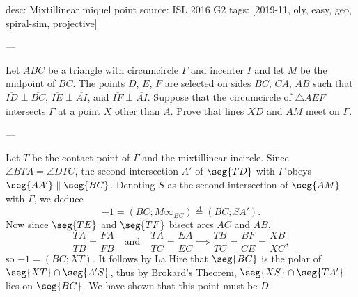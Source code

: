 desc: Mixtillinear miquel point
source: ISL 2016 G2
tags: [2019-11, oly, easy, geo, spiral-sim, projective]

---

Let $ABC$ be a triangle with circumcircle $\Gamma$ and incenter $I$ and let $M$ be the midpoint of $\overline{BC}$. The points $D$, $E$, $F$ are selected on sides $\overline{BC}$, $\overline{CA}$, $\overline{AB}$ such that $\overline{ID}\perp\overline{BC}$, $\overline{IE}\perp\overline{AI}$, and $\overline{IF}\perp\overline{AI}$. Suppose that the circumcircle of $\triangle AEF$ intersects $\Gamma$ at a point $X$ other than $A$. Prove that lines $XD$ and $AM$ meet on $\Gamma$.

---

Let $T$ be the contact point of $\Gamma$ and the mixtillinear incircle. Since $\angle BTA=\angle DTC$, the second intersection $A'$ of $\seg{TD}$ with $\Gamma$ obeys $\seg{AA'}\parallel\seg{BC}$. Denoting $S$ as the second intersection of $\seg{AM}$ with $\Gamma$, we deduce \[-1=(BC;M\infty_{BC})\stackrel A=(BC;SA').\]
Now since $\seg{TE}$ and $\seg{TF}$ bisect arcs $AC$ and $AB$, \[\frac{TA}{TB}=\frac{FA}{FB}\quad\text{and}\quad\frac{TA}{TC}=\frac{EA}{EC}\implies\frac{TB}{TC}=\frac{BF}{CE}=\frac{XB}{XC},\]
so $-1=(BC;XT)$. It follows by La Hire that $\seg{BC}$ is the polar of $\seg{XT}\cap\seg{A'S}$, thus by Brokard's Theorem, $\seg{XS}\cap\seg{TA'}$ lies on $\seg{BC}$. We have shown that this point must be $D$.
